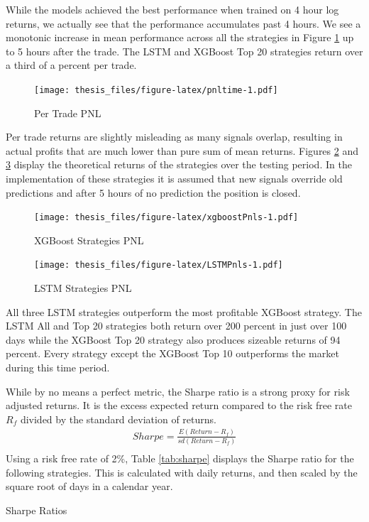 \documentclass[12pt,twoside]{dukestatscithesis}
\begin{document}
While the models achieved the best performance when trained on 4 hour
log returns, we actually see that the performance accumulates past 4
hours. We see a monotonic increase in mean performance across all the
strategies in Figure \ref{fig:pnltime} up to 5 hours after the trade.
The LSTM and XGBoost Top 20 strategies return over a third of a percent
per trade.
\begin{figure}
\centering
\texttt{[image: thesis\_files/figure-latex/pnltime-1.pdf]}
\caption{\label{fig:pnltime}Per Trade PNL}
\end{figure}
Per trade returns are slightly misleading as many signals overlap,
resulting in actual profits that are much lower than pure sum of mean
returns. Figures \ref{fig:xgboostPnls} and \ref{fig:LSTMPnls} display
the theoretical returns of the strategies over the testing period. In
the implementation of these strategies it is assumed that new signals
override old predictions and after 5 hours of no prediction the position
is closed.
\begin{figure}
\centering
\texttt{[image: thesis\_files/figure-latex/xgboostPnls-1.pdf]}
\caption{\label{fig:xgboostPnls}XGBoost Strategies PNL}
\end{figure}
\begin{figure}
\centering
\texttt{[image: thesis\_files/figure-latex/LSTMPnls-1.pdf]}
\caption{\label{fig:LSTMPnls}LSTM Strategies PNL}
\end{figure}
All three LSTM strategies outperform the most profitable XGBoost
strategy. The LSTM All and Top 20 strategies both return over 200
percent in just over 100 days while the XGBoost Top 20 strategy also
produces sizeable returns of 94 percent. Every strategy except the
XGBoost Top 10 outperforms the market during this time period.

While by no means a perfect metric, the Sharpe ratio is a strong proxy
for risk adjusted returns. It is the excess expected return compared to
the risk free rate \(R_f\) divided by the standard deviation of returns.
\begin{align}
  Sharpe = \frac{E(Return - R_f)}{sd(Return - R_f)}\label{eq:1} \\ 
\end{align}
Using a risk free rate of 2\%, Table \ref{tab:sharpe} displays the
Sharpe ratio for the following strategies. This is calculated with daily
returns, and then scaled by the square root of days in a calendar year.

\label{tab:sharpe}Sharpe Ratios
\end{document}

